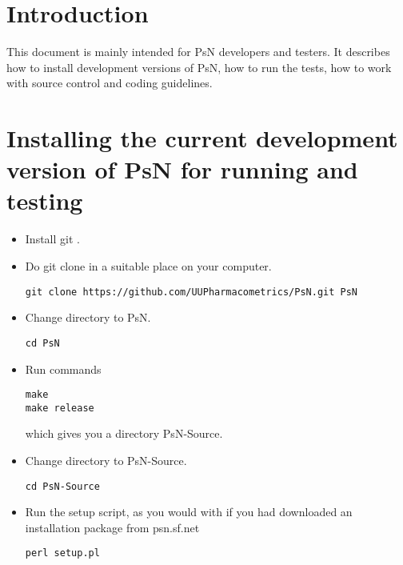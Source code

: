 
\usepackage{hyperref}



\maketitle
\tableofcontents
\newpage

  
\section{Introduction}

This document is mainly intended for PsN developers and testers. It describes how to install development versions of PsN, how to run the tests, how to work with source control and coding guidelines.

\section{Installing the current development version of PsN for running and testing}
\begin{itemize}
\item Install git \cite{git}. 
\item Do git clone in a suitable place on your computer.
\begin{verbatim}
git clone https://github.com/UUPharmacometrics/PsN.git PsN
\end{verbatim}
\item Change directory to PsN.
\begin{verbatim}
cd PsN
\end{verbatim}
\item Run commands 
\begin{verbatim}
make
make release
\end{verbatim}
\noindent which gives you a directory PsN-Source.
\item Change directory to PsN-Source.
\begin{verbatim}
cd PsN-Source
\end{verbatim}
\item Run the setup script, as you would with if you had downloaded an installation package from psn.sf.net
\begin{verbatim}
perl setup.pl
\end{verbatim}
\end{itemize}

